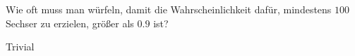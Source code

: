 \begin{exercise}

Wie oft muss man würfeln, damit die Wahrscheinlichkeit dafür, mindestens $100$ Sechser zu erzielen, größer als $0.9$ ist?

\end{exercise}

\begin{solution}

Trivial

\end{solution}
